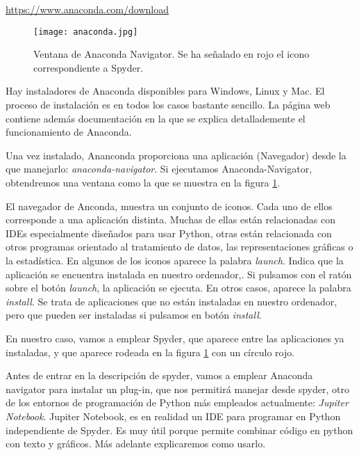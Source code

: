 \begin{center}
    \hyperlink{https://www.anaconda.com/download}{https://www.anaconda.com/download}
\end{center}

\begin{figure}[h]
    \centering
    \texttt{[image: anaconda.jpg]}
    \caption{Ventana de Anaconda Navigator. Se ha señalado en rojo el icono correspondiente a Spyder.}
    \label{fig:anaconda}
\end{figure} 

\begin{paracol}{2}
 Hay instaladores de Anaconda disponibles para Windows, Linux y Mac. El proceso de instalación es en todos los casos bastante sencillo. La página web contiene además documentación en la que se explica detallademente el funcionamiento de Anaconda.

 Una vez instalado, Ananconda proporciona una aplicación (Navegador) desde la que manejarlo: \emph{anaconda-navigator}. Si ejecutamos Anaconda-Navigator, obtendremos una ventana como la que se muestra en la figura \ref{fig:anaconda}.

 El navegador de Anconda, muestra un conjunto de iconos. Cada uno de ellos corresponde a una aplicación distinta. Muchas de ellas están relacionadas con IDEs especialmente diseñados para usar Python, otras están relacionada con otros programas orientado al tratamiento de datos, las representaciones gráficas o la estadística. En algunos de los iconos aparece la palabra \emph{launch}. Indica que la aplicación se encuentra instalada en nuestro ordenador,. Si pulsamos con el ratón sobre el botón \emph{launch}, la aplicación se ejecuta. En otros casos, aparece la palabra \emph{install}. Se trata de aplicaciones que no están instaladas en nuestro ordenador, pero que pueden ser instaladas si pulsamos en botón \emph{install}. 

 En nuestro caso, vamos a emplear Spyder, que aparece entre las aplicaciones ya instaladas, y que aparece rodeada en la figura \ref{fig:anaconda} con un círculo rojo.

 Antes de entrar en la descripción de spyder, vamos a emplear Anaconda navigator para instalar un plug-in, que nos permitirá manejar desde spyder, otro de los entornos de programación de Python más empleados actualmente: \emph{Jupiter Notebook}. Jupiter Notebook, es en realidad un IDE para programar en Python independiente de Spyder. Es muy útil porque permite combinar código en python con texto y gráficos. Más adelante explicaremos como usarlo.


\end{paracol}
